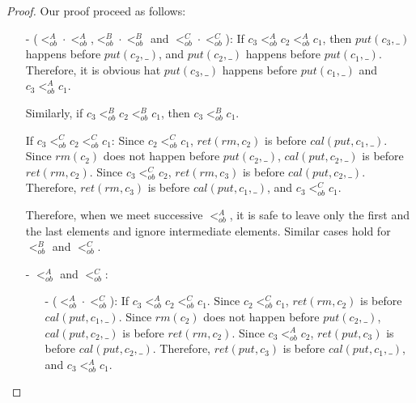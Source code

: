 \begin {proof}

Our proof proceed as follows:

\begin{itemize}
\setlength{\itemsep}{0.5pt}
\item[-] ($<_{\textit{ob}}^A \cdot <_{\textit{ob}}^A$,$<_{\textit{ob}}^B \cdot <_{\textit{ob}}^B$ and $<_{\textit{ob}}^C \cdot <_{\textit{ob}}^C$): If $c_3 <_{\textit{ob}}^A c_2 <_{\textit{ob}}^A c_1$, then $\textit{put}(c_3,\_)$ happens before $\textit{put}(c_2,\_)$, and $\textit{put}(c_2,\_)$ happens before $\textit{put}(c_1,\_)$. Therefore, it is obvious hat $\textit{put}(c_3,\_)$ happens before $\textit{put}(c_1,\_)$ and $c_3 <_{\textit{ob}}^A c_1$.

    Similarly, if $c_3 <_{\textit{ob}}^B c_2 <_{\textit{ob}}^B c_1$, then $c_3 <_{\textit{ob}}^B c_1$.

    If $c_3 <_{\textit{ob}}^C c_2 <_{\textit{ob}}^C c_1$: Since $c_2 <_{\textit{ob}}^C c_1$, $\textit{ret}(\textit{rm},c_2)$ is before $\textit{cal}(\textit{put},c_1,\_)$. Since $\textit{rm}(c_2)$ does not happen before $\textit{put}(c_2,\_)$, $\textit{cal}(\textit{put},c_2,\_)$ is before $\textit{ret}(\textit{rm},c_2)$. Since $c_3 <_{\textit{ob}}^C c_2$, $\textit{ret}(\textit{rm},c_3)$ is before $\textit{cal}(\textit{put},c_2,\_)$. Therefore, $\textit{ret}(\textit{rm},c_3)$ is before $\textit{cal}(\textit{put},c_1,\_)$, and $c_3 <_{\textit{ob}}^C c_1$.

    Therefore, when we meet successive $<_{\textit{ob}}^A$, it is safe to leave only the first and the last elements and ignore intermediate elements. Similar cases hold for $<_{\textit{ob}}^B$ and $<_{\textit{ob}}^C$.

\item[-] $<_{\textit{ob}}^A$ and $<_{\textit{ob}}^C$:

    \begin{itemize}
    \setlength{\itemsep}{0.5pt}
    \item[-] ($<_{\textit{ob}}^A \cdot <_{\textit{ob}}^C$): If $c_3 <_{\textit{ob}}^A c_2 <_{\textit{ob}}^C c_1$. Since $c_2 <_{\textit{ob}}^C c_1$, $\textit{ret}(\textit{rm},c_2)$ is before $\textit{cal}(\textit{put},c_1,\_)$. Since $\textit{rm}(c_2)$ does not happen before $\textit{put}(c_2,\_)$, $\textit{cal}(\textit{put},c_2,\_)$ is before $\textit{ret}(\textit{rm},c_2)$. Since $c_3 <_{\textit{ob}}^A c_2$, $\textit{ret}(\textit{put},c_3)$ is before $\textit{cal}(\textit{put},c_2,\_)$. Therefore, $\textit{ret}(\textit{put},c_3)$ is before $\textit{cal}(\textit{put},c_1,\_)$, and $c_3 <_{\textit{ob}}^A c_1$.


\end{itemize}
\end{itemize}
\end{proof}
